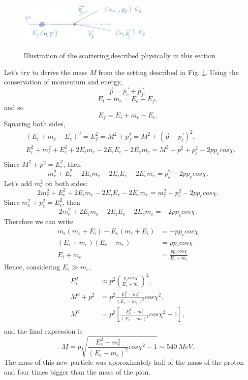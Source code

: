 \begin{figure}[!h]
    \centering
    \includegraphics[width=0.6\textwidth]{Figures/FNSN27_3.JPG}
    \label{fig:setting1}
    \caption{Illustration of the scattering,described physically in this section}
\end{figure} 

Let's try to derive the mass $M$ from the setting described in Fig. \ref{fig:setting1}. Using the conservation of momentum and energy,
\[ \vec{p} = \vec{p_e} + \vec{p_f}, \]
\[E_i + m_e = E_e + E_f, \]
and so
\[E_f =  E_i + m_e - E_e.\]
Squaring both sides,
 \begin{eqnarray*}
&(E_i + m_e - E_e)^2 = E_f^2 = M^2 + p_f^2 = M^2 + (\vec{p}-\vec{p_e})^2, \\
&E_i^2 + m_e^2 + E_e^2 + 2 E_i m_e - 2E_i E_e -2E_e m_e = M^2 + p^2 + p_e^2 - 2p p_e cos{\chi}. \\
\end{eqnarray*}
Since $M^2 + p^2 = E_i^2$, then
\[m_e^2 + E_e^2 + 2 E_i m_e - 2E_i E_e -2E_e m_e = p_e^2 - 2p p_e cos{\chi}.\]
Let's add $m_e^2$ on both sides:
\[2m_e^2 + E_e^2 + 2 E_i m_e - 2E_i E_e -2E_e m_e= m_e^2 + p_e^2 - 2p p_e cos{\chi}.\]
Since $m_e^2 + p_e^2 = E_e^2$, then
\[2m_e^2 + 2 E_i m_e - 2E_i E_e - 2E_e m_e = - 2p p_e cos{\chi}.\]
Therefore we can write
\begin{eqnarray*}
 m_e(m_e + E_i) - E_e(m_e + E_i) & = -p p_e cos{\chi} \\
 (E_i + m_e)(E_e - m_e) &= p p_e cos{\chi}\\
 E_i + m_e & = \frac{ p p_e cos{\chi}}{E_e - m_e}
\end{eqnarray*}
Hence, considering $E_i \gg m_e$,
\begin{eqnarray*}
E_i^2 &\approx p^2(\frac{ p_e cos{\chi}}{E_e - m_e})^2,\\
M^2 + p^2 &= p^2 \frac{E_e^2 - m_e^2}{(E_e - m_e)^2}cos{\chi}^2,\\
M^2 &= p^2 \left[ \frac{E_e^2 - m_e^2}{(E_e - m_e)^2}cos{\chi}^2 - 1 \right],\\
\end{eqnarray*}
and the final expression is
\[ M = p \sqrt{\frac{E_e^2 - m_e^2}{(E_e - m_e)^2}cos{\chi}^2 - 1 } \sim 540 \ MeV.\]
The mass of this new particle was approximately half of the mass of the proton and four times bigger than the mass of the pion.

